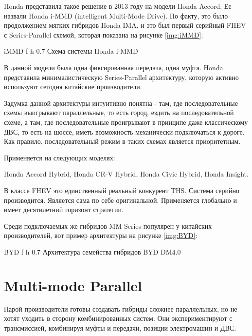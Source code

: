 Honda представила такое решение в 2013 году на модели Honda Accord. Ее назвали Honda i-MMD (intelligent Multi-Mode Drive). По факту, это было продолжением мягких гибридов Honda IMA, и это был первый серийный FHEV с Series-Parallel схемой, которая показана на рисунке \ref{img:iMMD}:

    {iMMD} %
    {f} %
    {h} %
    {0.7\textwidth} %
    {Схема системы Honda i-MMD \cite{iMMD}} %

\newpage

В данной модели была одна фиксированная передача, одна муфта. Honda представила минималистическую Series-Parallel архитектуру, которую активно используют сегодня китайские производители.

Задумка данной архитектуры интуитивно понятна - там, где последовательные схемы выигрывают параллельные, то есть город, ездить на последовательной схеме, а там, где последовательные проигрывают в принципе даже классическому ДВС, то есть на шоссе, иметь возможность механически подключаться к дороге. Как правило, последовательный режим в таких схемах является приоритетным.

Применяется на следующих моделях:

Honda Accord Hybrid, Honda CR-V Hybrid, Honda Civic Hybrid, Honda Insight.

В классе FHEV это единственный реальный конкурент THS. Система серийно производится. Является сама по себе оригинальной. Применяется глобально и имеет десятилетний горизонт стратегии.

Среди подключаемых же гибридов MM Series популярен у китайских производителей, вот пример архитектуры на рисунке \ref{img:BYD}:

    {BYD} %
    {f} %
    {h} %
    {0.7\textwidth} %
    {Архитектура семейства гибридов BYD DM4.0} %

\newpage

\section{Multi-mode Parallel} 

Парой производители готовы создавать гибриды сложнее параллельных, но не хотят уходить в сторону комбинированных систем. Они экспериментируют с трансмиссией, комбинируя муфты и передачи, позиции электромашин и ДВС.

